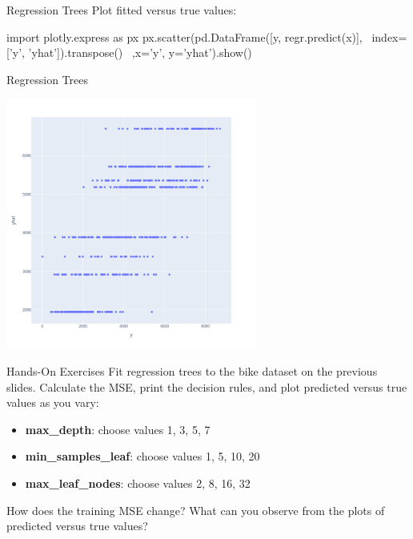 \documentclass[ignorenonframetext,xcolor=x11names]{beamer}
\begin{document}
\begin{frame}[fragile]{Regression Trees}
Plot fitted versus true values:
\begin{pythoncode}
import plotly.express as px
px.scatter(pd.DataFrame([y, regr.predict(x)], \
    index=['y', 'yhat']).transpose() \
        ,x='y', y='yhat').show()
\end{pythoncode}
\end{frame}

\begin{frame}{Regression Trees}

\centering

\includegraphics[height=3.25in]{tree_fitted_true.png}
\end{frame}

\begin{frame}{Hands-On Exercises}
Fit regression trees to the bike dataset on the previous slides. Calculate the MSE, print the decision rules, and plot predicted versus true values as you vary:
\begin{itemize}
   \item \textbf{max\_depth}: choose values 1, 3, 5, 7
   \item \textbf{min\_samples\_leaf}: choose values 1, 5, 10, 20
   \item \textbf{max\_leaf\_nodes}: choose values 2, 8, 16, 32
\end{itemize}
How does the training MSE change? What can you observe from the plots of predicted versus true values?
\end{frame}
\end{document}

